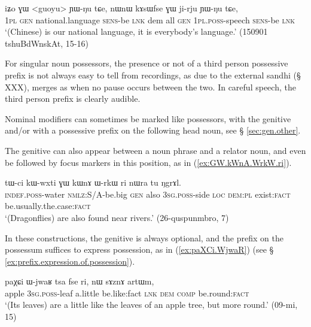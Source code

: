 \begin{exe}
\ex \label{ex:iZo.GW.guoyu}
\gll iʑo ɣɯ <guoyu> ɲɯ-ŋu tɕe, nɯnɯ kɤsɯfse ɣɯ ji-rju ɲɯ-ŋu tɕe, \\
\textsc{1pl} \textsc{gen} national.language \textsc{sens}-be \textsc{lnk} dem all \textsc{gen} \textsc{1pl}.\textsc{poss}-speech \textsc{sens}-be \textsc{lnk} \\
\glt `(Chinese) is our national language, it is everybody's language.' (150901 tshuBdWnskAt, 15-16)
\end{exe}

For singular noun possessors, the presence or not of a third person possessive prefix  is not always easy to tell from recordings, as due to the external sandhi (§ XXX),  merges as  when no pause occurs between the two. In careful speech, the third person prefix is clearly audible.

Nominal modifiers can sometimes be marked like possessors, with the genitive and/or with a possessive prefix on the following head noun, see § \ref{sec:gen.other}. 

The genitive can also appear between a noun phrase and a relator noun, and even be followed by focus markers in this position, as in (\ref{ex:GW.kWnA.WrkW.ri}).

\begin{exe}
\ex \label{ex:GW.kWnA.WrkW.ri}
\gll   tɯ-ci kɯ-wxti ɣɯ kɯnɤ ɯ-rkɯ ri nɯra tu ŋgrɤl.  \\
\textsc{indef}.\textsc{poss}-water \textsc{nmlz}:S/A-be.big \textsc{gen} also \textsc{3sg}.\textsc{poss}-side \textsc{loc} \textsc{dem}:\textsc{pl} exist:\textsc{fact} be.usually.the.case:\textsc{fact} \\
\glt `(Dragonflies) are also found near rivers.' (26-quspunmbro, 7)
\end{exe}

In these constructions, the genitive is always optional, and the prefix on the possessum suffices to express possession, as in (\ref{ex:paXCi.WjwaR}) (see § \ref{ex:prefix.expression.of.possession}).

\begin{exe}
\ex \label{ex:paXCi.WjwaR}
\gll paχɕi ɯ-jwaʁ tsa fse ri, nɯ sɤznɤ artɯm,\\
apple \textsc{3sg}.\textsc{poss}-leaf a.little be.like:fact \textsc{lnk} \textsc{dem} \textsc{comp} be.round:\textsc{fact} \\
\glt `(Its leaves) are a little like the leaves of an apple tree, but more round.' (09-mi, 15)
\end{exe}

